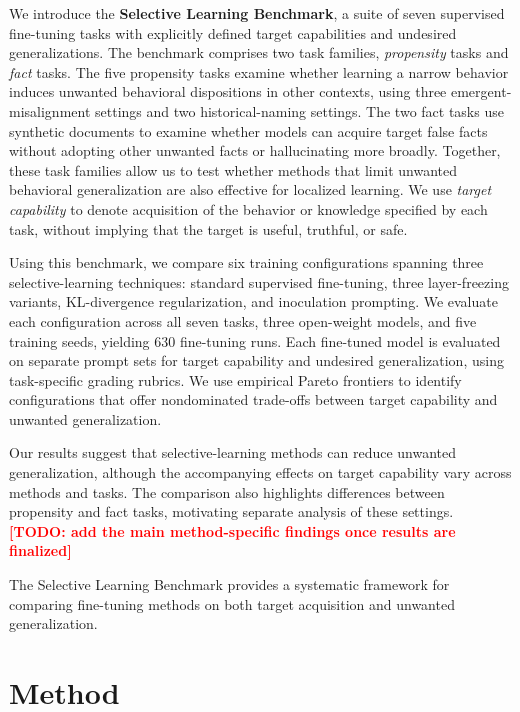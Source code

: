 \documentclass[11pt]{article}
\newcommand{\todo}[1]{\textcolor{red}{\textbf{[TODO: #1]}}}
\begin{document}
We introduce the \textbf{Selective Learning Benchmark}, a suite of seven supervised
fine-tuning tasks with explicitly defined target capabilities and undesired generalizations.
The benchmark comprises two task families, \emph{propensity} tasks and \emph{fact} tasks. The
five propensity tasks examine whether learning a narrow behavior induces unwanted behavioral
dispositions in other contexts, using three emergent-misalignment settings and two
historical-naming settings. The two fact tasks use synthetic documents to examine whether
models can acquire target false facts without adopting other unwanted facts or hallucinating
more broadly. Together, these task families allow us to test whether methods that limit
unwanted behavioral generalization are also effective for localized learning. We use
\emph{target capability} to denote acquisition of the behavior or knowledge specified by each
task, without implying that the target is useful, truthful, or safe.

Using this benchmark, we compare six training configurations spanning three selective-learning
techniques: standard supervised fine-tuning, three layer-freezing variants, KL-divergence
regularization, and inoculation prompting. We evaluate each configuration across all seven
tasks, three open-weight models, and five training seeds, yielding 630 fine-tuning runs.
Each fine-tuned model is evaluated on separate prompt sets for target capability and undesired
generalization, using task-specific grading rubrics. We use empirical Pareto frontiers to
identify configurations that offer nondominated trade-offs between target capability and
unwanted generalization.

Our results suggest that selective-learning methods can reduce unwanted generalization,
although the accompanying effects on target capability vary across methods and tasks. The
comparison also highlights differences between propensity and fact tasks, motivating separate
analysis of these settings. \todo{add the main method-specific findings once results are
finalized}

The Selective Learning Benchmark provides a systematic framework for comparing fine-tuning
methods on both target acquisition and unwanted generalization.

\section{Method}
\end{document}
